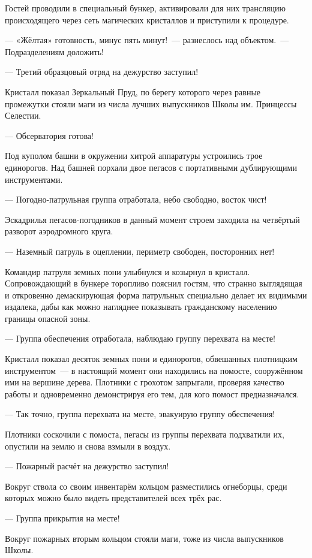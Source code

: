 \documentclass[twoside,a5paper,12pt]{extbook}
\begin{document}
Гостей проводили в специальный бункер, активировали для них трансляцию происходящего через сеть магических кристаллов и приступили к процедуре.

— «Жёлтая» готовность, минус пять минут! — разнеслось над объектом. — Подразделениям доложить!

— Третий образцовый отряд на дежурство заступил!

Кристалл показал Зеркальный Пруд, по берегу которого через равные промежутки стояли маги из числа лучших выпускников Школы им. Принцессы Селестии.

— Обсерватория готова!

Под куполом башни в окружении хитрой аппаратуры устроились трое единорогов. Над башней порхали двое пегасов с портативными дублирующими инструментами.

— Погодно-патрульная группа отработала, небо свободно, восток чист!

Эскадрилья пегасов-погодников в данный момент строем заходила на четвёртый разворот аэродромного круга.

— Наземный патруль в оцеплении, периметр свободен, посторонних нет!

Командир патруля земных пони улыбнулся и козырнул в кристалл. Сопровождающий в бункере торопливо пояснил гостям, что странно выглядящая и откровенно демаскирующая форма патрульных специально делает их видимыми издалека, дабы как можно нагляднее показывать гражданскому населению границы опасной зоны.

— Группа обеспечения отработала, наблюдаю группу перехвата на месте!

Кристалл показал десяток земных пони и единорогов, обвешанных плотницким инструментом — в настоящий момент они находились на помосте, сооружённом ими на вершине дерева. Плотники с грохотом запрыгали, проверяя качество работы и одновременно демонстрируя его тем, для кого помост предназначался.

— Так точно, группа перехвата на месте, эвакуирую группу обеспечения!

Плотники соскочили с помоста, пегасы из группы перехвата подхватили их, опустили на землю и снова взмыли в воздух.

— Пожарный расчёт на дежурство заступил!

Вокруг ствола со своим инвентарём кольцом разместились огнеборцы, среди которых можно было видеть представителей всех трёх рас.

— Группа прикрытия на месте!

Вокруг пожарных вторым кольцом стояли маги, тоже из числа выпускников Школы.
\end{document}
